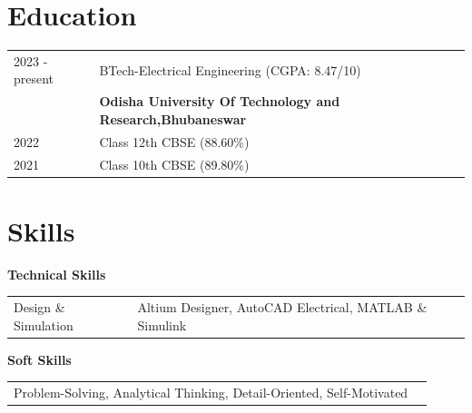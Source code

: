 \documentclass[a4paper,11pt]{article}
\begin{document}
\section{Education}
\begin{tabularx}{\linewidth}{@{}l X@{}}	
2023 - present & BTech-Electrical Engineering  \hfill (CGPA: 8.47/10) \\ 
\              & \textbf{Odisha University Of Technology and Research,Bhubaneswar}\\
2022 & Class 12th CBSE \hfill  (88.60\%) \\
2021 & Class 10th CBSE \hfill  (89.80\%) \\
\end{tabularx}

\section{Skills}
\textbf{Technical Skills}\newline
\begin{tabularx}{\linewidth}{@{}l X@{}}
Design \& Simulation & \normalsize{Altium Designer, AutoCAD Electrical, MATLAB \& Simulink} \\
\end{tabularx}
\textbf{Soft Skills}\newline
\begin{tabularx}{\linewidth}{@{}l X@{}}
\normalsize{Problem-Solving, Analytical Thinking, Detail-Oriented, Self-Motivated}
\end{tabularx}
\end{document}
